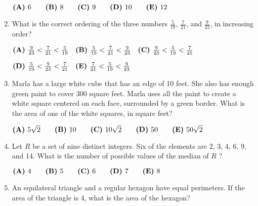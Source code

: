\documentclass{article}
\begin{document}
\begin{enumerate}[label=\arabic*., itemsep=0.5em]
\( \textbf{(A)}\hspace{.05in}6\qquad\textbf{(B)}\hspace{.05in}8\qquad\textbf{(C)}\hspace{.05in}9\qquad\textbf{(D)}\hspace{.05in}10\qquad\textbf{(E)}\hspace{.05in}12 \)\par \vspace{0.5em}\item What is the correct ordering of the three numbers \( \frac{5}{19} \), \( \frac{7}{21} \), and \( \frac{9}{23} \), in increasing order?

\( \textbf{(A)}\hspace{.05in}\frac{9}{23}<\frac{7}{21}<\frac{5}{19}\quad\textbf{(B)}\hspace{.05in}\frac{5}{19}<\frac{7}{21}<\frac{9}{23}\quad\textbf{(C)}\hspace{.05in}\frac{9}{23}<\frac{5}{19}<\frac{7}{21} \) 

\( \textbf{(D)}\hspace{.05in}\frac{5}{19}<\frac{9}{23}<\frac{7}{21}\quad\textbf{(E)}\hspace{.05in}\frac{7}{21}<\frac{5}{19}<\frac{9}{23} \)\par \vspace{0.5em}\item Marla has a large white cube that has an edge of 10 feet. She also has enough green paint to cover 300 square feet. Marla uses all the paint to create a white square centered on each face, surrounded by a green border. What is the area of one of the white squares, in square feet?

\( \textbf{(A)}\hspace{.05in}5\sqrt2\qquad\textbf{(B)}\hspace{.05in}10\qquad\textbf{(C)}\hspace{.05in}10\sqrt2\qquad\textbf{(D)}\hspace{.05in}50\qquad\textbf{(E)}\hspace{.05in}50\sqrt2 \)\par \vspace{0.5em}\item Let \( R \)  be a set of nine distinct integers. Six of the elements are 2, 3, 4, 6, 9, and 14. What is the number of possible values of the median of \( R \) ?

\( \textbf{(A)}\hspace{.05in}4\qquad\textbf{(B)}\hspace{.05in}5\qquad\textbf{(C)}\hspace{.05in}6\qquad\textbf{(D)}\hspace{.05in}7\qquad\textbf{(E)}\hspace{.05in}8 \)\par \vspace{0.5em}\item An equilateral triangle and a regular hexagon have equal perimeters. If the area of the triangle is 4, what is the area of the hexagon?


\end{enumerate}
\end{document}
